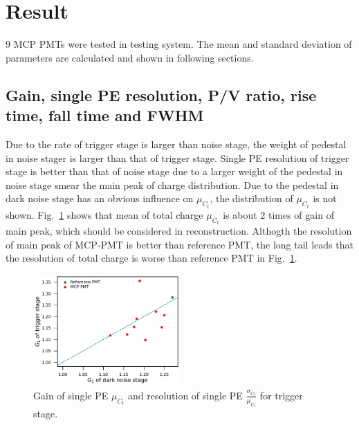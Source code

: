 \section{Result}
\label{Result}
9 MCP PMTs were tested in testing system. The mean and standard deviation of parameters are calculated and shown in following sections.

\subsection{Gain, single PE resolution, P/V ratio, rise time, fall time and FWHM}
Due to the rate of trigger stage is larger than noise stage, the weight of pedestal in noise stager is larger than that of trigger stage.
Single PE resolution of trigger stage is better than that of noise stage due to a larger weight of the pedestal in noise stage smear the main peak of charge distribution. Due to the pedestal in dark noise stage has an obvious influence on $\mu_{C_t}$, the distribution of $\mu_{C_t}$ is not shown. Fig.~\ref{fig:totalchargeCompare} shows that mean of total charge $\mu_{C_t}$ is about 2 times of gain of main peak, which should be considered in reconstruction. Althogth the resolution of main peak of MCP-PMT is better than reference PMT, the long tail leads that the resolution of total charge is worse than reference PMT in Fig.~\ref{fig:totalchargeCompare}.

\begin{figure}[!htbp]
    \centering
    \includegraphics[width=0.5\textwidth,page=4]{figures/result/compare.pdf}
    \caption{Gain of single PE $\mu_{C_t}$ and resolution of single PE $\frac{\sigma_{C_t}}{\mu_{C_t}}$ for trigger stage.}
    \label{fig:totalchargeCompare}
\end{figure}

